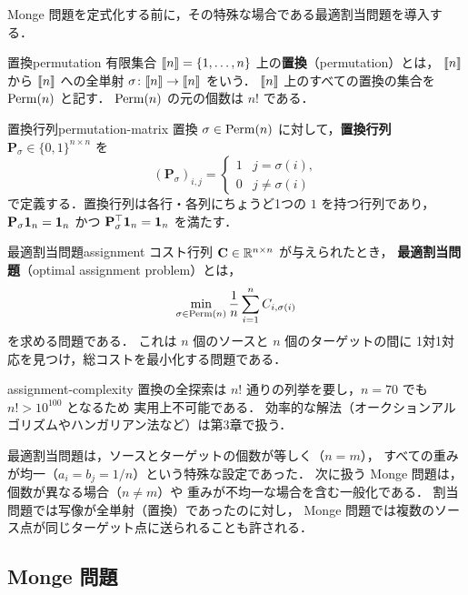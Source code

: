 Monge 問題を定式化する前に，その特殊な場合である最適割当問題を導入する．

\begin{definition}{置換}{permutation}
  有限集合 $\llbracket n \rrbracket = \{1, \ldots, n\}$ 上の\textbf{置換}（permutation）とは，
  $\llbracket n \rrbracket$ から $\llbracket n \rrbracket$ への全単射 $\sigma \colon \llbracket n \rrbracket \to \llbracket n \rrbracket$ をいう．
  $\llbracket n \rrbracket$ 上のすべての置換の集合を $\operatorname{Perm}(n)$ と記す．
  $\operatorname{Perm}(n)$ の元の個数は $n!$ である．
\end{definition}

\begin{definition}{置換行列}{permutation-matrix}
  置換 $\sigma \in \operatorname{Perm}(n)$ に対して，\textbf{置換行列} $\mathbf{P}_\sigma \in \{0, 1\}^{n \times n}$ を
  \[
    (\mathbf{P}_\sigma)_{i,j} =
    \begin{cases}
      1 & j = \sigma(i), \\
      0 & j \neq \sigma(i)
    \end{cases}
  \]
  で定義する．置換行列は各行・各列にちょうど1つの $1$ を持つ行列であり，
  $\mathbf{P}_\sigma \mathbf{1}_n = \mathbf{1}_n$ かつ $\mathbf{P}_\sigma^\top \mathbf{1}_n = \mathbf{1}_n$ を満たす．
\end{definition}

\begin{setting}{最適割当問題}{assignment}
  コスト行列 $\mathbf{C} \in \mathbb{R}^{n \times n}$ が与えられたとき，
  \textbf{最適割当問題}（optimal assignment problem）とは，
  \[
    \min_{\sigma \in \operatorname{Perm}(n)} \frac{1}{n} \sum_{i=1}^n C_{i, \sigma(i)}
  \]
  を求める問題である．
  これは $n$ 個のソースと $n$ 個のターゲットの間に
  1対1対応を見つけ，総コストを最小化する問題である．
\end{setting}

\begin{remark}{}{assignment-complexity}
  置換の全探索は $n!$ 通りの列挙を要し，$n = 70$ でも $n! > 10^{100}$ となるため
  実用上不可能である．
  効率的な解法（オークションアルゴリズムやハンガリアン法など）は第3章で扱う．
\end{remark}

最適割当問題は，ソースとターゲットの個数が等しく（$n = m$），
すべての重みが均一（$a_i = b_j = 1/n$）という特殊な設定であった．
次に扱う Monge 問題は，個数が異なる場合（$n \neq m$）や
重みが不均一な場合を含む一般化である．
割当問題では写像が全単射（置換）であったのに対し，
Monge 問題では複数のソース点が同じターゲット点に送られることも許される．

\subsection{Monge 問題}
\label{subsec:monge}

